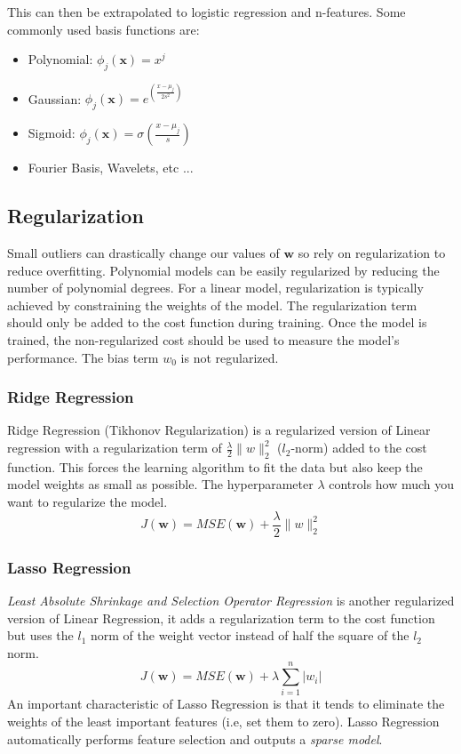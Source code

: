 \documentclass[12pt]{article}
\begin{document}
        This can then be extrapolated to logistic regression and n-features. Some commonly used basis functions are:

        \begin{itemize}
            \item Polynomial: $\phi_j(\boldsymbol{x}) = x^j$
            \item Gaussian: $\phi_j(\boldsymbol{x}) = e^{(\frac{x-\mu_j}{2s^2})}$
            \item Sigmoid: $\phi_j(\boldsymbol{x}) = \sigma{(\frac{x-\mu_j}{s})}$
            \item Fourier Basis, Wavelets, etc ...
        \end{itemize}

    \subsection{Regularization}
        Small outliers can drastically change our values of $\boldsymbol{w}$ so rely on regularization to reduce overfitting. Polynomial models can be easily regularized
        by reducing the number of polynomial degrees. For a linear model, regularization is typically achieved by constraining the weights of the model. The regularization term should only
        be added to the cost function during training. Once the model is trained, the non-regularized cost should be used to measure the model's performance. The bias term $w_0$ is not regularized.

        \subsubsection{Ridge Regression}
        Ridge Regression (Tikhonov Regularization) is a regularized version of Linear regression with a regularization term of $\frac{\lambda}{2}\|w\|_2^2$ ($l_2$-norm) added to the cost function.
        This forces the learning algorithm to fit the data but also keep the model weights as small as possible. The hyperparameter $\lambda$ controls how much you want to regularize the model.
        $$ J(\boldsymbol{w}) = MSE(\boldsymbol{w}) + \frac{\lambda}{2}\|w\|^2_2 $$

        \subsubsection{Lasso Regression}
            \textit{Least Absolute Shrinkage and Selection Operator Regression} is another regularized version of Linear Regression, it adds a regularization term to the cost function
            but uses the $l_1$ norm of the weight vector instead of half the square of the $l_2$ norm.
            $$ J(\boldsymbol{w}) = MSE(\boldsymbol{w}) + \lambda\sum_{i=1}^n|w_i| $$
            An important characteristic of Lasso Regression is that it tends to eliminate the weights of the least important features (i.e, set them to zero). Lasso Regression automatically performs 
            feature selection and outputs a \textit{sparse model}.
\end{document}
